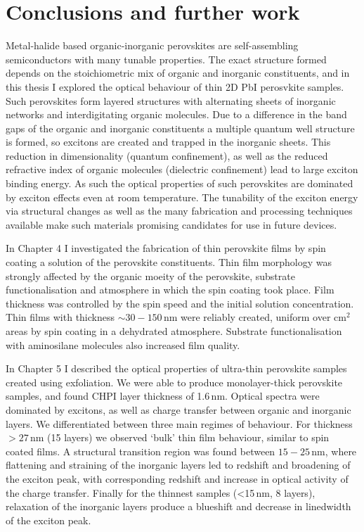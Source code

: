 
\chapter{Conclusions and further work}

\graphicspath{{Chapter8/Figures/}}

Metal-halide based organic-inorganic perovskites are self-assembling semiconductors with many tunable properties. The exact structure formed depends on the stoichiometric mix of organic and inorganic constituents, and in this thesis I explored the optical behaviour of thin 2D PbI perosvkite samples. Such perovskites form layered structures with alternating sheets of inorganic  networks and interdigitating organic molecules. Due to a difference in the band gaps of the organic and inorganic constituents a multiple quantum well structure is formed, so excitons are created and trapped in the inorganic sheets. This reduction in dimensionality (quantum confinement), as well as the reduced refractive index of organic molecules (dielectric confinement) lead to large exciton binding energy. As such the optical properties of such perovskites are dominated by exciton effects even at room temperature. The tunability of the exciton energy via structural changes as well as the many fabrication and processing techniques available make such materials promising candidates for use in future devices.

In Chapter 4 I investigated the fabrication of thin perovskite films by spin coating a solution of the perovskite constituents. Thin film morphology was strongly affected by the organic moeity of the perovskite, substrate functionalisation and atmosphere in which the spin coating took place. Film thickness was controlled by the spin speed and the initial solution concentration. Thin films with thickness $\sim30-150$\,nm were reliably created, uniform over cm$^2$ areas by spin coating in a dehydrated atmosphere. Substrate functionalisation with aminosilane molecules also increased film quality.

In Chapter 5 I described the optical properties of ultra-thin perovskite samples created using exfoliation. We were able to produce monolayer-thick perovskite samples, and found CHPI layer thickness of 1.6\,nm. Optical spectra were dominated by excitons, as well as charge transfer between organic and inorganic layers. We differentiated between three main regimes of behaviour. For thickness $>27$\,nm (15 layers) we observed `bulk' thin film behaviour, similar to spin coated films. A structural transition region was found between $15-25$\,nm, where flattening and straining of the inorganic layers led to redshift and broadening of the exciton peak, with corresponding redshift and increase in optical activity of the charge transfer. Finally for the thinnest samples (<15\,nm, 8 layers), relaxation of the inorganic layers produce a blueshift and decrease in linedwidth of the exciton peak.

